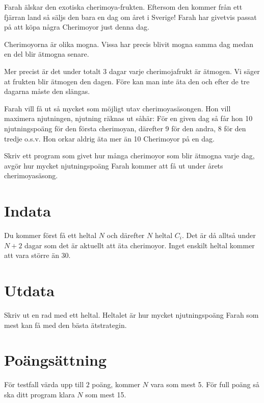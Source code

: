 
Farah älskar den exotiska cherimoya-frukten. Eftersom den kommer från ett
fjärran land så säljs den bara en dag om året i Sverige! Farah har givetvis
passat på att köpa några Cherimoyor just denna dag.

Cherimoyorna är olika mogna. Vissa har precis blivit mogna samma dag medan en
del blir ätmogna senare.

Mer precist är det under totalt 3 dagar varje cherimojafrukt är ätmogen. Vi
säger at frukten blir ätmogen den dagen. Före kan man inte äta den och efter de
tre dagarna måste den slängas.

Farah vill få ut så mycket som möjligt utav cherimoyasäsongen. Hon vill
maximera njutningen, njutning räknas ut såhär: För en given dag så får hon 10
njutningspoäng för den första cherimoyan, därefter 9 för den andra, 8 för den
tredje o.s.v. Hon orkar aldrig äta mer än 10 Cherimoyor på en dag.

Skriv ett program som givet hur många cherimoyor som blir ätmogna varje dag,
avgör hur mycket njutningspoäng Farah kommer att få ut under årets
cherimoyasäsong.

\section*{Indata}

Du kommer först få ett heltal $N$ och därefter $N$ heltal
$C_i$. Det är då alltså under $N+2$ dagar som det är aktuellt att äta cherimoyor.
Inget enskilt heltal kommer att vara större än 30.

\section*{Utdata}

Skriv ut en rad med ett heltal. Heltalet är hur mycket njutningspoäng Farah som
mest kan få med den bästa ätstrategin.

\section*{Poängsättning}

För testfall värda upp till $2$ poäng, kommer $N$ vara som mest 5. För full
poäng så ska ditt program klara $N$ som mest 15.
